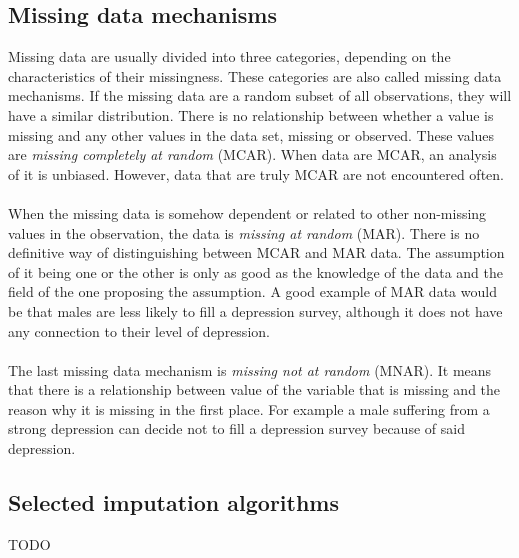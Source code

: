 \documentclass[11pt]{article}
\begin{document}
    \subsection{Missing data mechanisms}
      Missing data are usually divided into three categories, depending on the characteristics of their missingness. These categories are also called missing data mechanisms. If the missing data are a random subset of all observations, they will have a similar distribution. There is no relationship between whether a value is missing and any other values in the data set, missing or observed. These values are {\it missing completely at random} (MCAR). When data are MCAR, an analysis of it is unbiased. However, data that are truly MCAR are not encountered often.
      \\~\\
      When the missing data is somehow dependent or related to other non-missing values in the observation, the data is {\it missing at random} (MAR). There is no definitive way of distinguishing between MCAR and MAR data. The assumption of it being one or the other is only as good as the knowledge of the data and the field of the one proposing the assumption. A good example of MAR data would be that males are less likely to fill a depression survey, although it does not have any connection to their level of depression.
      \\~\\
      The last missing data mechanism is {\it missing not at random} (MNAR). It means that there is a relationship between value of the variable that is missing and the reason why it is missing in the first place. For example a male suffering from a strong depression can decide not to fill a depression survey because of said depression.
    \subsection{Selected imputation algorithms}
      {\color{red}TODO}
\end{document}
